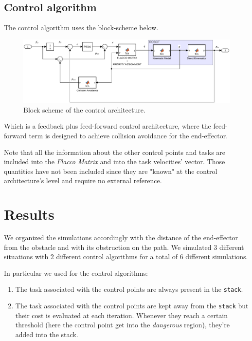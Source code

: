 \documentclass[12pt, a4paper]{article}
\begin{document}
\subsection{Control algorithm}
The control algorithm uses the block-scheme below.
\begin{figure}[H]
\centering
\includegraphics[width = 1.2\linewidth]{./plots/ControlSchemeModel.pdf}
\caption{Block scheme of the control architecture.}
\end{figure}
Which is a feedback plus feed-forward control architecture, where the feed-forward term is designed to achieve collision avoidance for the end-effector.

Note that all the information about the other control points and tasks are included into the \emph{Flacco Matrix} and into the task velocities' vector.
Those quantities have not been included since they are "known" at the control architecture's level and require no external reference.

\section{Results}
We organized the simulations accordingly with the distance of the end-effector from the obstacle and with its obstruction on the path. We simulated 3 different situations with 2 different control algorithms for a total of 6 different simulations.

In particular we used for the control algorithms:
\begin{enumerate}
\item The task associated with the control points are always present in the \texttt{stack}.
\item The task associated with the control points are kept away from the \texttt{stack} but their cost is evaluated at each iteration. Whenever they reach a certain threshold (here the control point get into the \emph{dangerous} region), they're added into the stack.
\end{enumerate}
\end{document}
